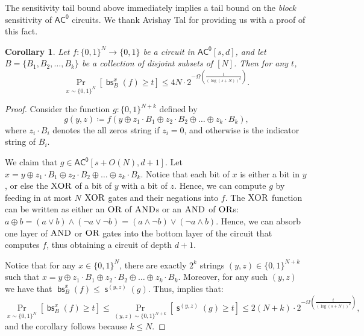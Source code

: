 \documentclass[10pt,a4paper]{article}
\newtheorem{corollary}[theorem]{Corollary}
\newcommand{\AND}{\normalfont\textsc{AND}} %
\newcommand{\OR}{\normalfont\textsc{OR}}
\newcommand{\XOR}{\normalfont\textsc{XOR}}
\DeclareMathOperator{\s}{\mathsf{s}}
\DeclareMathOperator{\bs}{\mathsf{bs}}
\begin{document}
The sensitivity tail bound above immediately implies a tail bound on the \textit{block} sensitivity of $\mathsf{AC^0}$ circuits. We thank Avishay Tal for providing us with a proof of this fact.

\begin{corollary}
\label{cor:ac0_block_sensitivity_tail_bound}
Let $f: \{0,1\}^N \to \{0,1\}$ be a circuit in $\mathsf{AC^0}[s, d]$, and let $B = \{B_1,B_2,\ldots,B_k\}$ be a collection of disjoint subsets of $[N]$. Then for any $t$,
\[
\Pr_{x \sim \{0,1\}^N} \left[ \bs_B^x(f) \ge t \right] \le 4N\cdot 2^{-\Omega\left(\frac{t}{(\log (s + N))^{d}}\right)}.
\]
\end{corollary}
\begin{proof}
Consider the function $g: \{0,1\}^{N + k}$ defined by
\[
g(y, z) \coloneqq f\left(y \oplus z_1 \cdot B_1 \oplus z_2 \cdot B_2 \oplus \ldots \oplus z_k \cdot B_k\right),
\]
where $z_i \cdot B_i$ denotes the all zeros string if $z_i = 0$, and otherwise is the indicator string of $B_i$.

We claim that $g \in \mathsf{AC^0}[s + O(N), d+1]$. Let $x = y \oplus z_1 \cdot B_1 \oplus z_2 \cdot B_2 \oplus \ldots \oplus z_k \cdot B_k$. Notice that each bit of $x$ is either a bit in $y$, or else the $\XOR$ of a bit of $y$ with a bit of $z$. Hence, we can compute $g$ by feeding in at most $N$ $\XOR$ gates and their negations into $f$. The $\XOR$ function can be written as either an $\OR$ of $\AND$s or an $\AND$ of $\OR$s: $a \oplus b = (a \lor b) \land (\lnot a \lor \lnot b) = (a \land \lnot b) \lor (\lnot a \land  b)$. Hence, we can absorb one layer of $\AND$ or $\OR$ gates into the bottom layer of the circuit that computes $f$, thus obtaining a circuit of depth $d+1$.

Notice that for any $x \in \{0,1\}^N$, there are exactly $2^k$ strings $(y, z) \in \{0,1\}^{N + k}$ such that $x = y \oplus z_1 \cdot B_1 \oplus z_2 \cdot B_2 \oplus \ldots \oplus z_k \cdot B_k$. Moreover, for any such $(y, z)$ we have that $\bs_B^x(f) \le \s^{(y,z)}(g)$. Thus,  implies that:
\[
\Pr_{x \sim \{0,1\}^N} \left[ \bs_B^x(f) \ge t \right] \le \Pr_{(y, z) \sim \{0,1\}^{N + k}} \left[ \s^{(y, z)}(g) \ge t \right] \le 2(N + k)\cdot 2^{-\Omega\left(\frac{t}{(\log (s + N))^{d}}\right)},
\]
and the corollary follows because $k \le N$.
\end{proof}
\end{document}
